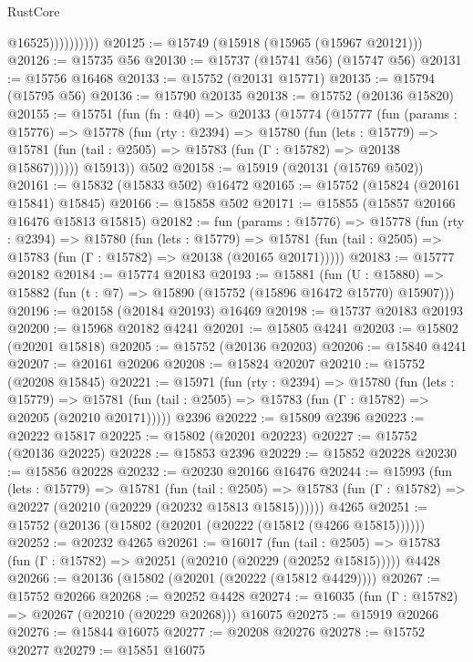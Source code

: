 \begin{lexlean}{RustCore}
\begin{coremodule}
                        @16525))))))))))
@20125 := @15749 (@15918 (@15965 (@15967 @20121)))
@20126 := @15735 @56
@20130 := @15737 (@15741 @56) (@15747 @56)
@20131 := @15756 @16468
@20133 := @15752 (@20131 @15771)
@20135 := @15794 (@15795 @56)
@20136 := @15790 @20135
@20138 := @15752 (@20136 @15820)
@20155 := @15751
    (fun (fn : @40) =>
    @20133
      (@15774
        (@15777
          (fun (params : @15776) =>
          @15778
            (fun (rty : @2394) =>
            @15780
              (fun (lets : @15779) =>
              @15781 (fun (tail : @2505) => @15783 (fun (Γ : @15782) => @20138 @15867))))))
        @15913))
    @502
@20158 := @15919 (@20131 (@15769 @502))
@20161 := @15832 (@15833 @502) @16472
@20165 := @15752 (@15824 (@20161 @15841) @15845)
@20166 := @15858 @502
@20171 := @15855 (@15857 @20166 @16476 @15813 @15815)
@20182 := fun (params : @15776) =>
  @15778
    (fun (rty : @2394) =>
    @15780
      (fun (lets : @15779) =>
      @15781 (fun (tail : @2505) => @15783 (fun (Γ : @15782) => @20138 (@20165 @20171)))))
@20183 := @15777 @20182
@20184 := @15774 @20183
@20193 := @15881
    (fun (U : @15880) => @15882 (fun (t : @7) => @15890 (@15752 (@15896 @16472 @15770) @15907)))
@20196 := @20158 (@20184 @20193) @16469
@20198 := @15737 @20183 @20193
@20200 := @15968 @20182 @4241
@20201 := @15805 @4241
@20203 := @15802 (@20201 @15818)
@20205 := @15752 (@20136 @20203)
@20206 := @15840 @4241
@20207 := @20161 @20206
@20208 := @15824 @20207
@20210 := @15752 (@20208 @15845)
@20221 := @15971
    (fun (rty : @2394) =>
    @15780
      (fun (lets : @15779) =>
      @15781 (fun (tail : @2505) => @15783 (fun (Γ : @15782) => @20205 (@20210 @20171)))))
    @2396
@20222 := @15809 @2396
@20223 := @20222 @15817
@20225 := @15802 (@20201 @20223)
@20227 := @15752 (@20136 @20225)
@20228 := @15853 @2396
@20229 := @15852 @20228
@20230 := @15856 @20228
@20232 := @20230 @20166 @16476
@20244 := @15993
    (fun (lets : @15779) =>
    @15781
      (fun (tail : @2505) =>
      @15783 (fun (Γ : @15782) => @20227 (@20210 (@20229 (@20232 @15813 @15815))))))
    @4265
@20251 := @15752 (@20136 (@15802 (@20201 (@20222 (@15812 (@4266 @15815))))))
@20252 := @20232 @4265
@20261 := @16017
    (fun (tail : @2505) => @15783 (fun (Γ : @15782) => @20251 (@20210 (@20229 (@20252 @15815)))))
    @4428
@20266 := @20136 (@15802 (@20201 (@20222 (@15812 @4429))))
@20267 := @15752 @20266
@20268 := @20252 @4428
@20274 := @16035 (fun (Γ : @15782) => @20267 (@20210 (@20229 @20268))) @16075
@20275 := @15919 @20266
@20276 := @15844 @16075
@20277 := @20208 @20276
@20278 := @15752 @20277
@20279 := @15851 @16075

\end{coremodule}
\end{lexlean}
